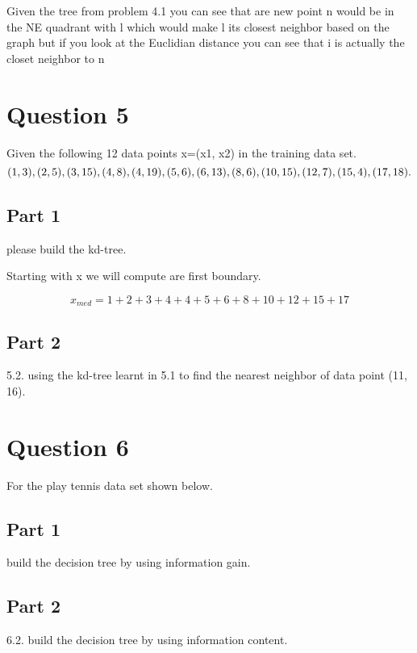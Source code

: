 \documentclass{report}
\begin{document}
Given the tree from problem 4.1 you can see that are new point n would be in the NE quadrant with l which would make l its closest neighbor based on the graph but if you look at the Euclidian distance you can see that i is actually the closet neighbor to n 

\chapter{Question 5}

Given the following 12 data points x=(x1,	x2)	in	the	training	data	set.
\begin{equation*}
  (1,	3),	(2,	5),	(3,	15),	(4,	8),	(4,	19),	(5,	6),	(6,	13), \\
(8,	6),	(10,	15),	(12,	7),	(15,	4),	(17,	18).
\end{equation*}

\section{Part 1}
please	build	the	kd-tree.



Starting with x we will compute are first boundary. 

\begin{equation*}
   x_{med} = 1 + 2 + 3 + 4 + 4+5+6+8+10+12+15+17
\end{equation*}

\section{Part 2}	
5.2.	using the	kd-tree	learnt	in	5.1	to	find	the	nearest	neighbor	of	data	point	(11,	
16).

\chapter{Question 6}

For	the	play	tennis	data	set	shown	below.

\section{Part 1}
build	the	decision	tree	by	using	information	gain.

\section{Part 2}
6.2.	build	the	decision	tree	by	using	information	content.
\end{document}
